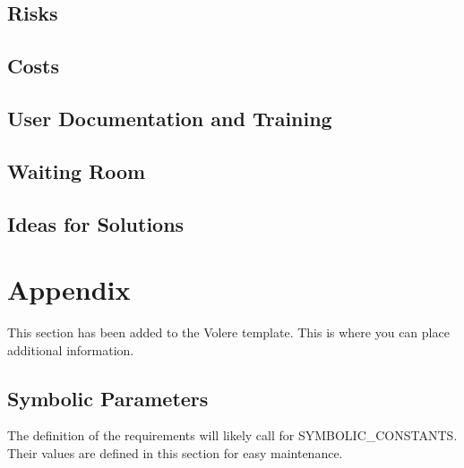 \documentclass[12pt, titlepage]{article}
\begin{document}
\subsection{Risks}

\subsection{Costs}

\subsection{User Documentation and Training}

\subsection{Waiting Room}

\subsection{Ideas for Solutions}





\newpage

\section{Appendix}

This section has been added to the Volere template.  This is where you can place
additional information.

\subsection{Symbolic Parameters}

The definition of the requirements will likely call for SYMBOLIC\_CONSTANTS.
Their values are defined in this section for easy maintenance.
\end{document}
